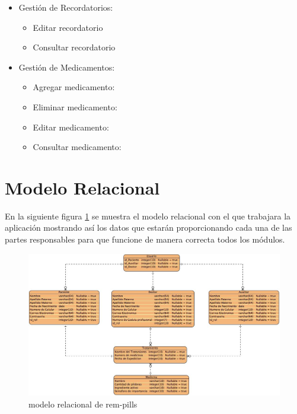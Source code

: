 \begin{itemize}
	\item Gestión de Recordatorios:
	\begin{itemize}
		\item Editar recordatorio
		\item Consultar recordatorio
	\end{itemize}
	
	\item Gestión de Medicamentos:
	\begin{itemize}
		\item Agregar medicamento:
		\item Eliminar medicamento:
		\item Editar medicamento:
		\item Consultar medicamento:
	\end{itemize}
\end{itemize}

\section{Modelo Relacional}
En la siguiente figura \ref{fig:modelorelacional} se muestra el modelo relacional con el que trabajara la aplicación mostrando así los datos que estarán proporcionando cada una de las partes responsables para que funcione de manera correcta todos los módulos.
\begin{figure}[htb]
	\centering
	\includegraphics[width=1.1\textwidth]{images/cap2/modelorelacional}
	\caption{modelo relacional de rem-pills} \label{fig:modelorelacional}
\end{figure} 